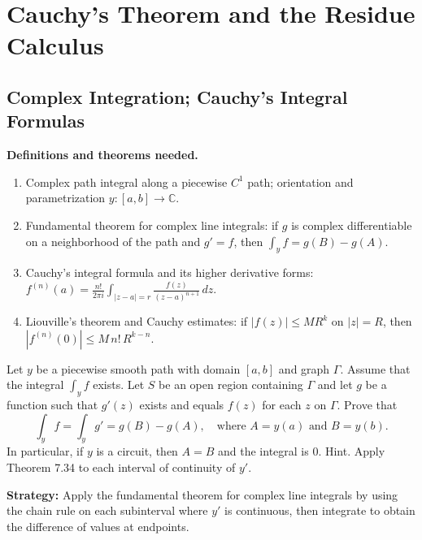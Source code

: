 
\chapter{Cauchy's Theorem and the Residue Calculus}
\section{Complex Integration; Cauchy's Integral Formulas}

\noindent\textbf{Definitions and theorems needed.}
\begin{enumerate}[label=(\alph*)]
\item Complex path integral along a piecewise $C^1$ path; orientation and parametrization $y:[a,b]\to\mathbb C$.
\item Fundamental theorem for complex line integrals: if $g$ is complex differentiable on a neighborhood of the path and $g'=f$, then $\int_y f= g(B)-g(A)$.
\item Cauchy's integral formula and its higher derivative forms: $f^{(n)}(a)=\frac{n!}{2\pi i}\int_{|z-a|=r} \frac{f(z)}{(z-a)^{n+1}}\,dz$.
\item Liouville's theorem and Cauchy estimates: if $|f(z)|\le M R^k$ on $|z|=R$, then $|f^{(n)}(0)|\le M\, n!\, R^{k-n}$.
\end{enumerate}



\begin{problembox}
Let \( y \) be a piecewise smooth path with domain \([a, b]\) and graph \(\Gamma\). Assume that the integral \( \int_y f \) exists. Let \( S \) be an open region containing \(\Gamma\) and let \( g \) be a function such that \( g'(z) \) exists and equals \( f(z) \) for each \( z \) on \(\Gamma\). Prove that
\[\int_y f = \int_y g' = g(B) - g(A), \quad \text{where } A = y(a) \text{ and } B = y(b).\]
In particular, if \( y \) is a circuit, then \( A = B \) and the integral is 0. Hint. Apply Theorem 7.34 to each interval of continuity of \( y' \).
\end{problembox}

\noindent\textbf{Strategy:} Apply the fundamental theorem for complex line integrals by using the chain rule on each subinterval where \( y' \) is continuous, then integrate to obtain the difference of values at endpoints.

